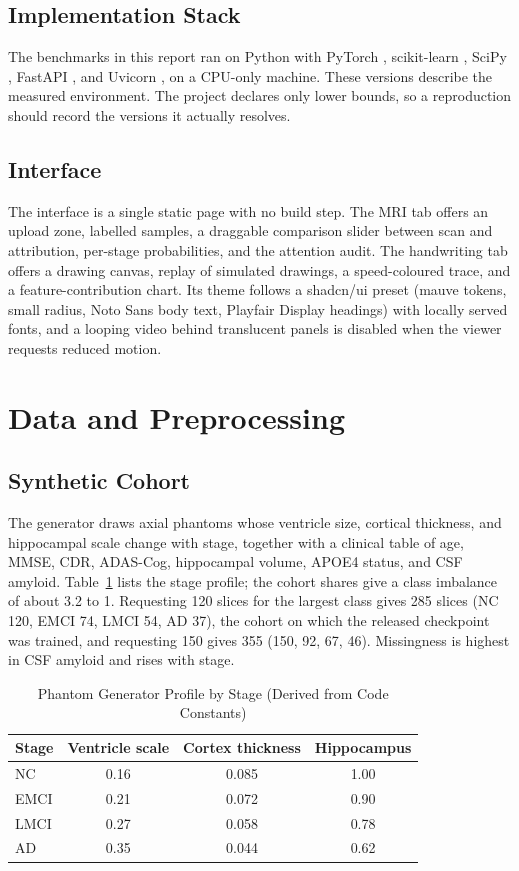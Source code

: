 \documentclass[conference]{IEEEtran}
\begin{document}
\subsection{Implementation Stack}
The benchmarks in this report ran on Python \PyVer{} with PyTorch \TorchVer{} \cite{pytorch}, scikit-learn \SklVer{} \cite{sklearn}, SciPy \SciVer{} \cite{scipy}, FastAPI \FastapiVer{}, and Uvicorn \UvicornVer{}, on a CPU-only machine. These versions describe the measured environment. The project declares only lower bounds, so a reproduction should record the versions it actually resolves.

\subsection{Interface}
The interface is a single static page with no build step. The MRI tab offers an upload zone, labelled samples, a draggable comparison slider between scan and attribution, per-stage probabilities, and the attention audit. The handwriting tab offers a drawing canvas, replay of simulated drawings, a speed-coloured trace, and a feature-contribution chart. Its theme follows a shadcn/ui preset \cite{shadcn} (mauve tokens, small radius, Noto Sans body text, Playfair Display headings) with locally served fonts, and a looping video behind translucent panels is disabled when the viewer requests reduced motion.

\section{Data and Preprocessing}
\subsection{Synthetic Cohort}
The generator draws axial phantoms whose ventricle size, cortical thickness, and hippocampal scale change with stage, together with a clinical table of age, MMSE, CDR, ADAS-Cog, hippocampal volume, APOE4 status, and CSF amyloid. Table~\ref{tab:profile} lists the stage profile; the cohort shares give a class imbalance of about 3.2 to 1. Requesting 120 slices for the largest class gives 285 slices (NC 120, EMCI 74, LMCI 54, AD 37), the cohort on which the released checkpoint was trained, and requesting 150 gives 355 (150, 92, 67, 46). Missingness is highest in CSF amyloid and rises with stage.

\begin{table}[t]
\centering
\caption{Phantom Generator Profile by Stage (Derived from Code Constants)}
\label{tab:profile}
\begin{tabular}{@{}lccc@{}}
\toprule
Stage & Ventricle scale & Cortex thickness & Hippocampus \\
\midrule
NC   & 0.16 & 0.085 & 1.00 \\
EMCI & 0.21 & 0.072 & 0.90 \\
LMCI & 0.27 & 0.058 & 0.78 \\
AD   & 0.35 & 0.044 & 0.62 \\
\bottomrule
\end{tabular}
\end{table}
\end{document}
